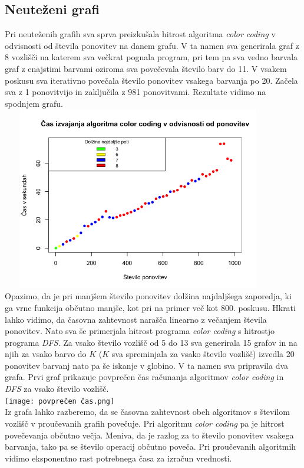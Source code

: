 \documentclass[a4paper, 9pt]{article}
\begin{document}
\subsection{Neuteženi grafi}
Pri neuteženih grafih sva sprva preizkušala hitrost algoritma \textit{color coding} v odvisnosti od števila ponovitev na danem grafu. V ta namen sva generirala graf z 8 vozlišči na katerem sva večkrat pognala program, pri tem pa sva vedno barvala graf z enajstimi barvami oziroma sva povečevala število barv do 11. V vsakem poskusu sva iterativno povečala število ponovitev vsakega barvanja po 20. Začela sva z 1 ponovitvijo in zaključila z 981 ponovitvami. Rezultate vidimo na spodnjem grafu. \\
\includegraphics[width = 12cm, height = 8cm]{izvajanje_od_ponovitev.png}\\
Opazimo, da je pri manjšem število ponovitev dolžina najdaljšega zaporedja, ki ga vrne funkcija občutno manjše, kot pri na primer več kot 800. poskusu. Hkrati lahko vidimo, da časovna zahtevnost narašča linearno z večanjem števila ponovitev. 
Nato sva še primerjala hitrost programa \textit{color coding} s hitrostjo programa \textit{DFS}. Za vsako število vozlišč od 5 do 13 sva generirala 15 grafov in na njih za vsako barvo do $K$ ($K$ sva spreminjala za vsako število vozlišč) izvedla 20 ponovitev barvanj nato pa še iskanje v globino. V ta namen sva pripravila dva grafa. Prvi graf prikazuje povprečen čas računanja algoritmov \textit{color coding} in \textit{DFS} za vsako število vozlišč. \\
\texttt{[image: povprečen čas.png]}\\
Iz grafa lahko razberemo, da se časovna zahtevnost obeh algoritmov s številom vozlišč v proučevanih grafih povečuje. Pri algoritmu \textit{color coding} pa je hitrost povečevanja občutno večja. Meniva, da je razlog za to število ponovitev vsakega barvanja, tako pa se število operacij občutno poveča. Pri proučevanih algoritmih vidimo eksponentno rast potrebnega časa za izračun vrednosti.
\end{document}
